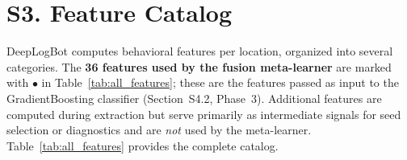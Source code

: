 \documentclass[11pt,a4paper]{article}
\begin{document}
\section{S3. Feature Catalog}
\label{sec:features}

DeepLogBot computes behavioral features per location, organized into several categories. The \textbf{36 features used by the fusion meta-learner} are marked with $\bullet$ in Table~\ref{tab:all_features}; these are the features passed as input to the GradientBoosting classifier (Section~S4.2, Phase~3). Additional features are computed during extraction but serve primarily as intermediate signals for seed selection or diagnostics and are \emph{not} used by the meta-learner. Table~\ref{tab:all_features} provides the complete catalog.
\end{document}
